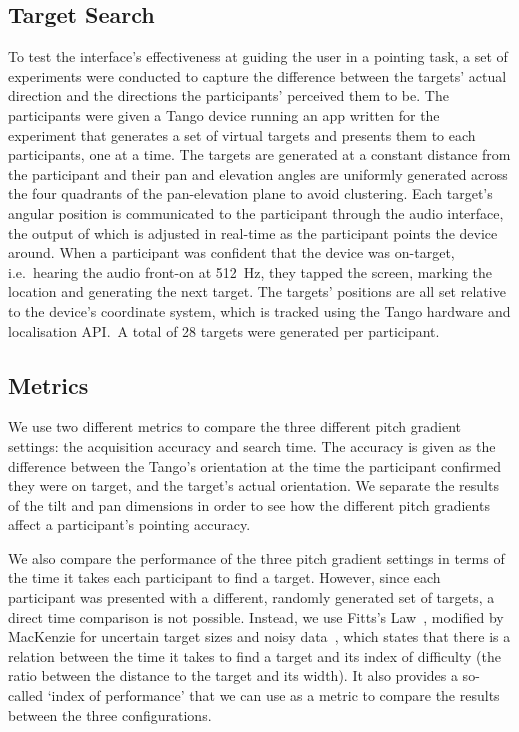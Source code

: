 \documentclass{article}
\begin{document}
\subsection{Target Search}

To test the interface's effectiveness at guiding the user in a pointing task, a set of experiments were conducted to capture the difference between the targets' actual direction and the directions the participants' perceived them to be.
The participants were given a Tango device running an app written for the experiment that generates a set of virtual targets and presents them to each participants, one at a time. 
The targets are generated at a constant distance from the participant and their pan and elevation angles are uniformly generated across the four quadrants of the pan-elevation plane to avoid clustering.
Each target's angular position is communicated to the participant through the audio interface, the output of which is adjusted in real-time as the participant points the device around. 
When a participant was confident that the device was on-target, i.e.~hearing the audio front-on at \SI{512}{\hertz}, they tapped the screen, marking the location and generating the next target.
The targets' positions are all set relative to the device's coordinate system, which is tracked using the Tango hardware and localisation API.\
A total of 28 targets were generated per participant. 

\subsection{Metrics}

We use two different metrics to compare the three different pitch gradient settings: the acquisition accuracy and search time.
The accuracy is given as the difference between the Tango's orientation at the time the participant confirmed they were on target, and the target's actual orientation.
We separate the results of the tilt and pan dimensions in order to see how the different pitch gradients affect a participant's pointing accuracy. 

We also compare the performance of the three pitch gradient settings in terms of the time it takes each participant to find a target.
However, since each participant was presented with a different, randomly generated set of targets, a direct time comparison is not possible.
Instead, we use Fitts's Law~\cite{fitts1954information}, modified by MacKenzie for uncertain target sizes and noisy data~\cite{mackenzie1992fitts}, which states that there is a relation between the time it takes to find a target and its index of difficulty (the ratio between the distance to the target and its width).
It also provides a so-called `index of performance' that we can use as a metric to compare the results between the three configurations. 
\end{document}
